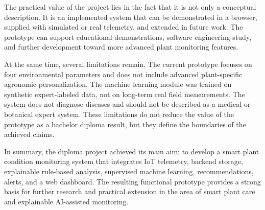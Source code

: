 The practical value of the project lies in the fact that it is not only a conceptual description. It is an implemented system that can be demonstrated in a browser, supplied with simulated or real telemetry, and extended in future work. The prototype can support educational demonstrations, software engineering study, and further development toward more advanced plant monitoring features.

At the same time, several limitations remain. The current prototype focuses on four environmental parameters and does not include advanced plant-specific agronomic personalization. The machine learning module was trained on synthetic expert-labeled data, not on long-term real field measurements. The system does not diagnose diseases and should not be described as a medical or botanical expert system. These limitations do not reduce the value of the prototype as a bachelor diploma result, but they define the boundaries of the achieved claims.

In summary, the diploma project achieved its main aim: to develop a smart plant condition monitoring system that integrates IoT telemetry, backend storage, explainable rule-based analysis, supervised machine learning, recommendations, alerts, and a web dashboard. The resulting functional prototype provides a strong basis for further research and practical extension in the area of smart plant care and explainable AI-assisted monitoring.
